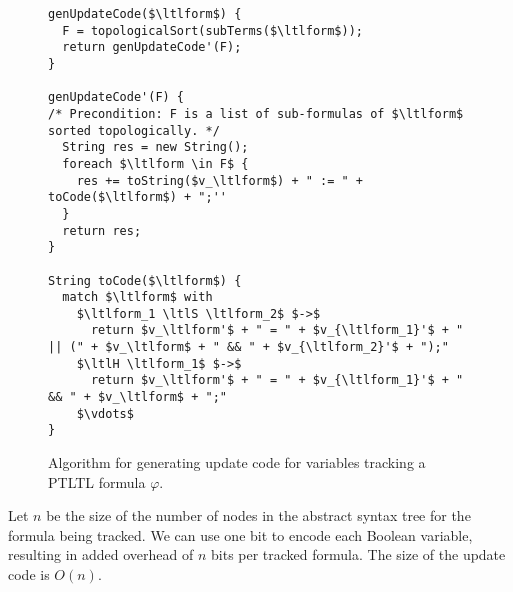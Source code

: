 \documentclass{article}
\newcommand{\ltlform}{\varphi}
\newcommand{\ltlH}{\mathbf{H}}
\newcommand{\ltlS}{\mathrel{\mathbf{S}}}
\begin{document}
\begin{figure}
\begin{lstlisting}
genUpdateCode($\ltlform$) {
  F = topologicalSort(subTerms($\ltlform$));
  return genUpdateCode'(F);
}

genUpdateCode'(F) {
/* Precondition: F is a list of sub-formulas of $\ltlform$ sorted topologically. */
  String res = new String();
  foreach $\ltlform \in F$ {
    res += toString($v_\ltlform$) + " := " + toCode($\ltlform$) + ";''
  }
  return res;
}

String toCode($\ltlform$) {
  match $\ltlform$ with
    $\ltlform_1 \ltlS \ltlform_2$ $->$
      return $v_\ltlform'$ + " = " + $v_{\ltlform_1}'$ + " || (" + $v_\ltlform$ + " && " + $v_{\ltlform_2}'$ + ");"
    $\ltlH \ltlform_1$ $->$
      return $v_\ltlform'$ + " = " + $v_{\ltlform_1}'$ + " && " + $v_\ltlform$ + ";"
    $\vdots$
}
\end{lstlisting}
\caption{\label{fig:alg}Algorithm for generating update code for variables tracking a PTLTL formula $\ltlform$.}
\end{figure}

Let $n$ be the size of the number of nodes in the abstract syntax tree for the formula being tracked.  We can use one bit to encode each Boolean variable, resulting in added overhead of $n$ bits per tracked formula.  The size of the update code is $O(n)$.
\end{document}
